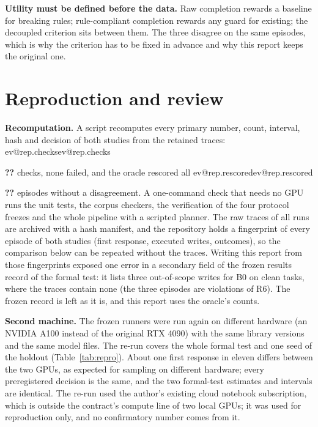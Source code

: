 \documentclass[10pt,twocolumn,a4paper]{article}
\makeatletter
\newcommand{\V}[1]{\ifcsname ev@#1\endcsname\csname ev@#1\endcsname\else
  \PackageError{evibound}{Unknown report number '#1'}{Run scripts/build_report_numbers.py --keys}\textbf{??}\fi}
\newcommand{\cond}[1]{\textsf{#1}}
\newcommand{\Bz}{\cond{B0}}
\newcommand{\para}[1]{\par\smallskip\noindent\textbf{#1}\hspace{0.5em}}
\makeatother
\begin{document}
\para{Utility must be defined before the data.}
Raw completion rewards a baseline for breaking rules; rule-compliant completion rewards any guard for
existing; the decoupled criterion sits between them. The three disagree on the same episodes, which is
why the criterion has to be fixed in advance and why this report keeps the original one.

\section{Reproduction and review}
\label{sec:repro}

\para{Recomputation.}
A script recomputes every primary number, count, interval, hash and decision of both studies from the
retained traces: \V{rep.checks} checks, none failed, and the oracle rescored all \V{rep.rescored}
episodes without a disagreement. A one-command check that needs no GPU runs the unit tests, the corpus
checkers, the verification of the four protocol freezes and the whole pipeline with a scripted planner.
The raw traces of all runs are archived with a hash manifest, and the repository holds a fingerprint of
every episode of both studies (first response, executed writes, outcomes), so the comparison below can
be repeated without the traces. Writing this report from those fingerprints exposed one error in a
secondary field of the frozen results record of the formal test: it lists three out-of-scope writes for
\Bz{} on clean tasks, where the traces contain none (the three episodes are violations of R6). The
frozen record is left as it is, and this report uses the oracle's counts.

\para{Second machine.}
The frozen runners were run again on different hardware (an NVIDIA A100 instead of the original RTX
4090) with the same library versions and the same model files. The re-run covers the whole formal test
and one seed of the holdout (Table~\ref{tab:repro}). About one first response in eleven differs between
the two GPUs, as expected for sampling on different hardware; every preregistered decision is the same,
and the two formal-test estimates and intervals are identical. The re-run used the author's existing
cloud notebook subscription, which is outside the contract's compute line of two local GPUs; it was used
for reproduction only, and no confirmatory number comes from it.
\end{document}
